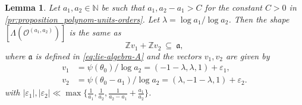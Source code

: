 \documentclass[11pt,letterpaper]{amsart}
\newtheorem{lem}[theorem]{Lemma}
\theoremstyle{definition}
\theoremstyle{remark}
\newcommand{\bb}[1]{\mathbb{#1}}
\newcommand{\N}{\bb N}
\begin{document}
	\begin{lem}
		\label{le:where_is_shape}
		Let $a_1 , a_2 \in \N$ be such that $a_1,a_2-a_1 > C$ for the constant $C>0$ in  \cref{pr:proposition_polynom-units-orders}.
		Let $\lambda = \log a_1 / \log a_2$. Then the shape $[ \Lambda(\mathcal{O}^{(a_1,a_2)}) ]$ is the same as 
		\begin{equation}
			\mathbb{Z}v_1 + \mathbb{Z} v_2  \ \subseteq \ \mathfrak{a},
		\end{equation}
		where $\mathfrak{a}$ is defined in \cref{eq:lie-algebra-A} and the vectors $v_1,v_2$ are given by
		\begin{align}
			v_1 &=\psi(\theta_0)/\log a_2   = (-1-\lambda,\lambda,1)  + \varepsilon_1, \\ 
			v_2 &=\psi(\theta_0-a_1)/\log a_2  = (\lambda,-1-\lambda,1) + \varepsilon_2.
		\end{align}
		with $|\varepsilon_1|, |\varepsilon_2| \ll  \max\{\frac{1}{a_1}, \frac{1}{a_2},\frac{1}{a_2-a_1} + \frac{a_1}{a_2}\}$.
	\end{lem}
\end{document}
